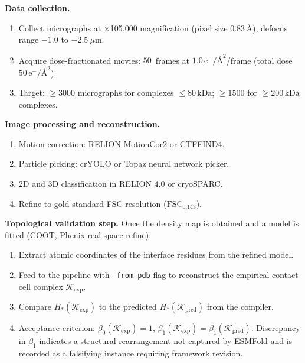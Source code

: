 \noindent\textbf{Data collection.}
\begin{enumerate}[leftmargin=1.5cm, label=\arabic*.]
  \item Collect micrographs at $\times$105,000 magnification
        (pixel size $0.83\,\text{\AA}$), defocus range $-1.0$ to
        $-2.5~\mu\mathrm{m}$.
  \item Acquire dose-fractionated movies: $50$~frames at
        $1.0\,\mathrm{e}^-/\text{\AA}^2$/frame (total dose
        $50\,\mathrm{e}^-/\text{\AA}^2$).
  \item Target: $\ge 3000$ micrographs for complexes $\le 80\,\mathrm{kDa}$;
        $\ge 1500$ for $\ge 200\,\mathrm{kDa}$ complexes.
\end{enumerate}

\noindent\textbf{Image processing and reconstruction.}
\begin{enumerate}[leftmargin=1.5cm, label=\arabic*.]
  \item Motion correction: RELION MotionCor2 or CTFFIND4.
  \item Particle picking: crYOLO or Topaz neural network picker.
  \item 2D and 3D classification in RELION 4.0 or cryoSPARC.
  \item Refine to gold-standard FSC resolution ($\mathrm{FSC}_{0.143}$).
\end{enumerate}

\noindent\textbf{Topological validation step.}  Once the density map is
obtained and a model is fitted (COOT, Phenix real-space refine):
\begin{enumerate}[leftmargin=1.5cm, label=\arabic*.]
  \item Extract atomic coordinates of the interface residues from the refined
        model.
  \item Feed to the \PLQ{} pipeline with \texttt{--from-pdb} flag to
        reconstruct the empirical contact cell complex
        $\mathcal{K}_{\text{exp}}$.
  \item Compare $H_*(\mathcal{K}_{\text{exp}})$ to the predicted
        $H_*(\mathcal{K}_{\text{pred}})$ from the \ToposLang{} compiler.
  \item Acceptance criterion: $\beta_0(\mathcal{K}_{\text{exp}}) = 1$,
        $\beta_1(\mathcal{K}_{\text{exp}}) = \beta_1(\mathcal{K}_{\text{pred}})$.
        Discrepancy in $\beta_1$ indicates a structural rearrangement not
        captured by ESMFold and is recorded as a falsifying instance requiring
        framework revision.
\end{enumerate}

